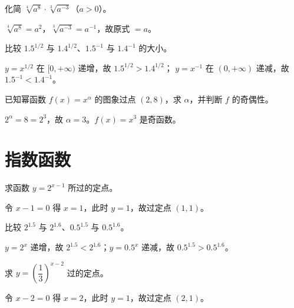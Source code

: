 \begin{problem}
化简 $\sqrt[4]{a^8}\cdot\sqrt[3]{a^{-3}}$（$a>0$）。
\end{problem}
\begin{solution}
$\sqrt[4]{a^8}=a^2$，$\sqrt[3]{a^{-3}}=a^{-1}$，故原式 $=a$。
\end{solution}

\begin{problem}
比较 $1.5^{1/2}$ 与 $1.4^{1/2}$、$1.5^{-1}$ 与 $1.4^{-1}$ 的大小。
\end{problem}
\begin{solution}
$y=x^{1/2}$ 在 $[0,+\infty)$ 递增，故 $1.5^{1/2}>1.4^{1/2}$；
$y=x^{-1}$ 在 $(0,+\infty)$ 递减，故 $1.5^{-1}<1.4^{-1}$。
\end{solution}

\begin{problem}
已知幂函数 $f(x)=x^{\alpha}$ 的图象过点 $(2,8)$，求 $\alpha$，并判断 $f$ 的奇偶性。
\end{problem}
\begin{solution}
$2^{\alpha}=8=2^3$，故 $\alpha=3$。$f(x)=x^3$ 是奇函数。
\end{solution}

\section{指数函数}

\begin{problem}
求函数 $y=2^{x-1}$ 所过的定点。
\end{problem}
\begin{solution}
令 $x-1=0$ 得 $x=1$，此时 $y=1$，故过定点 $(1,1)$。
\end{solution}

\begin{problem}
比较 $2^{1.5}$ 与 $2^{1.6}$、$0.5^{1.5}$ 与 $0.5^{1.6}$。
\end{problem}
\begin{solution}
$y=2^x$ 递增，故 $2^{1.5}<2^{1.6}$；$y=0.5^x$ 递减，故 $0.5^{1.5}>0.5^{1.6}$。
\end{solution}

\begin{problem}
求 $y=\left(\dfrac13\right)^{x-2}$ 过的定点。
\end{problem}
\begin{solution}
令 $x-2=0$ 得 $x=2$，此时 $y=1$，故过定点 $(2,1)$。
\end{solution}

